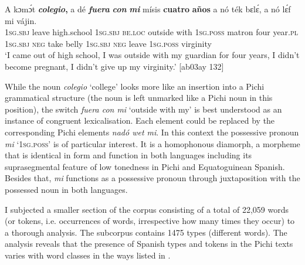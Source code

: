 \ea%
    \label{ex:key:1695}
    \gll A    kɔmɔ́t  \textbf{\textit{colegio}}\textbf{\textmd{,}}    a    dé    \textbf{\textit{fuera}}  \textbf{\textit{con}}    \textbf{\textit{mi}}
mísis  \textbf{cuatro}  \textbf{años}    a    nó  ték  bɛlɛ́,
a    nó  lɛ́f    mi    vájin.\\
\textsc{1sg.sbj}  leave  high.school  \textsc{1sg.sbj}  \textsc{be.loc}  outside  with    \textsc{1sg.poss}
matron  four    year.\textsc{pl}  \textsc{1sg.sbj}  \textsc{neg}  take  belly
\textsc{1sg.sbj}  \textsc{neg}  leave  \textsc{1sg.poss}  virginity\\
\glt ‘I came out of high school, I was outside with my guardian for four years, 
I didn’t become pregnant, I didn’t give up my virginity.’ [ab03ay 132]
\z

While the noun \textit{colegio} ‘college’ looks more like an insertion into a Pichi grammatical structure (the noun is left unmarked like a Pichi noun in this position), the switch \textit{fuera con mi} ‘outside with my’ is best understood as an instance of congruent lexicalisation. Each element could be replaced by the corresponding Pichi elements \textit{nadó wet mi}. In this context the possessive pronoun \textit{mi} ‘\textsc{1sg.poss}’ is of particular interest. It is a homophonous diamorph, a morpheme that is identical in form and function in both languages including its suprasegmental feature of low tonedness in Pichi and Equatoguinean Spanish. Besides that, \textit{mi} functions as a possessive pronoun through juxtaposition with the possessed noun in both languages. 


I subjected a smaller section of the corpus consisting of a total of 22,059 words (or tokens, i.e. occurrences of words, irrespective how many times they occur) to a thorough analysis. The subcorpus contains 1475 types (different words). The analysis reveals that the presence of Spanish types and tokens in the Pichi texts varies with word classes in the ways listed in .


